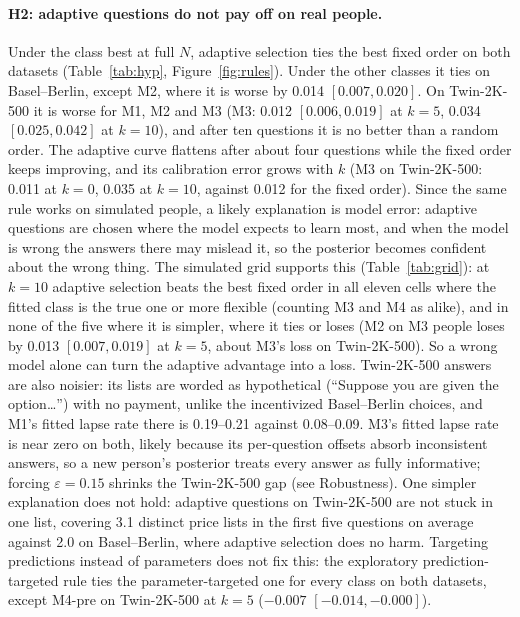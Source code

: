 \documentclass{article}
\begin{document}
\paragraph{H2: adaptive questions do not pay off on real people.} Under the class best at full $N$, adaptive selection ties the best fixed order on both datasets (Table~\ref{tab:hyp}, Figure~\ref{fig:rules}). Under the other classes it ties on Basel--Berlin, except M2, where it is worse by 0.014 $[0.007, 0.020]$. On Twin-2K-500 it is worse for M1, M2 and M3 (M3: 0.012 $[0.006, 0.019]$ at $k = 5$, 0.034 $[0.025, 0.042]$ at $k = 10$), and after ten questions it is no better than a random order. The adaptive curve flattens after about four questions while the fixed order keeps improving, and its calibration error grows with $k$ (M3 on Twin-2K-500: 0.011 at $k = 0$, 0.035 at $k = 10$, against 0.012 for the fixed order). Since the same rule works on simulated people, a likely explanation is model error: adaptive questions are chosen where the model expects to learn most, and when the model is wrong the answers there may mislead it, so the posterior becomes confident about the wrong thing. The simulated grid supports this (Table~\ref{tab:grid}): at $k = 10$ adaptive selection beats the best fixed order in all eleven cells where the fitted class is the true one or more flexible (counting M3 and M4 as alike), and in none of the five where it is simpler, where it ties or loses (M2 on M3 people loses by 0.013 $[0.007, 0.019]$ at $k = 5$, about M3's loss on Twin-2K-500). So a wrong model alone can turn the adaptive advantage into a loss. Twin-2K-500 answers are also noisier: its lists are worded as hypothetical (``Suppose you are given the option\ldots'') with no payment, unlike the incentivized Basel--Berlin choices, and M1's fitted lapse rate there is 0.19--0.21 against 0.08--0.09. M3's fitted lapse rate is near zero on both, likely because its per-question offsets absorb inconsistent answers, so a new person's posterior treats every answer as fully informative; forcing $\varepsilon = 0.15$ shrinks the Twin-2K-500 gap (see Robustness). One simpler explanation does not hold: adaptive questions on Twin-2K-500 are not stuck in one list, covering 3.1 distinct price lists in the first five questions on average against 2.0 on Basel--Berlin, where adaptive selection does no harm. Targeting predictions instead of parameters does not fix this: the exploratory prediction-targeted rule ties the parameter-targeted one for every class on both datasets, except M4-pre on Twin-2K-500 at $k = 5$ ($-0.007$ $[-0.014, -0.000]$).
\end{document}

